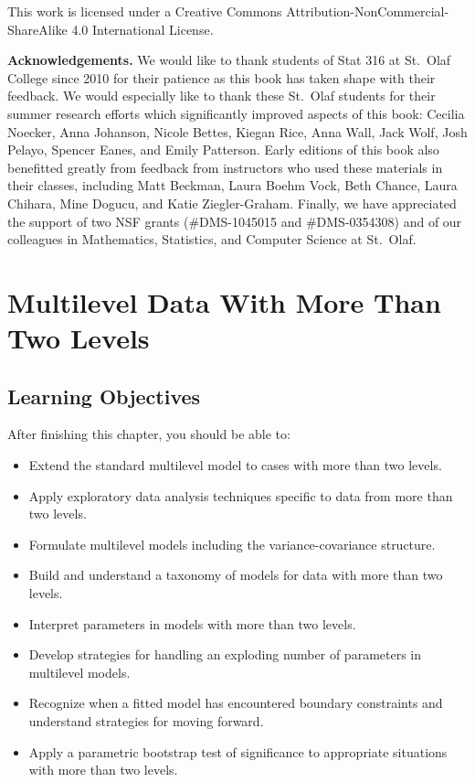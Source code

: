 \documentclass[
]{krantz}
\providecommand{\tightlist}{%
  \setlength{\itemsep}{0pt}\setlength{\parskip}{0pt}}
\begin{document}
This work is licensed under a Creative Commons Attribution-NonCommercial-ShareAlike 4.0 International License.

\textbf{Acknowledgements.} We would like to thank students of Stat 316 at St.~Olaf College since 2010 for their patience as this book has taken shape with their feedback. We would especially like to thank these St.~Olaf students for their summer research efforts which significantly improved aspects of this book: Cecilia Noecker, Anna Johanson, Nicole Bettes, Kiegan Rice, Anna Wall, Jack Wolf, Josh Pelayo, Spencer Eanes, and Emily Patterson. Early editions of this book also benefitted greatly from feedback from instructors who used these materials in their classes, including Matt Beckman, Laura Boehm Vock, Beth Chance, Laura Chihara, Mine Dogucu, and Katie Ziegler-Graham. Finally, we have appreciated the support of two NSF grants (\#DMS-1045015 and \#DMS-0354308) and of our colleagues in Mathematics, Statistics, and Computer Science at St.~Olaf.

\hypertarget{ch-3level}{%
\chapter{Multilevel Data With More Than Two Levels}\label{ch-3level}}

\hypertarget{learning-objectives}{%
\section{Learning Objectives}\label{learning-objectives}}

After finishing this chapter, you should be able to:

\begin{itemize}
\tightlist
\item
  Extend the standard multilevel model to cases with more than two levels.
\item
  Apply exploratory data analysis techniques specific to data from more than two levels.
\item
  Formulate multilevel models including the variance-covariance structure.
\item
  Build and understand a taxonomy of models for data with more than two levels.
\item
  Interpret parameters in models with more than two levels.
\item
  Develop strategies for handling an exploding number of parameters in multilevel models.
\item
  Recognize when a fitted model has encountered boundary constraints and understand strategies for moving forward.
\item
  Apply a parametric bootstrap test of significance to appropriate situations with more than two levels.
\end{itemize}
\end{document}
